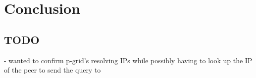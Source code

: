 \chapter{Conclusion}
\label{chap:conclusion}
\section{TODO}
- wanted to confirm p-grid's resolving IPs while possibly having to look up the
  IP of the peer to send the query to
